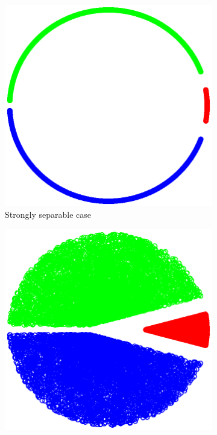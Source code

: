 \begin{figure}[h]
\centering
\begin{subfigure}[b]{0.23\textwidth}
\captionsetup{justification=centering}
\begin{center}
\hspace*{-0.3cm} \includegraphics[width=1.15\textwidth, trim={0, 0cm, 0, 0}, clip]{figures/strong_points}
\caption{Strongly separable case}
\label{figure:strongly-separable-dataset}
\end{center}
\end{subfigure}
\hfill
\begin{subfigure}[b]{0.23\textwidth}
\captionsetup{justification=centering}
\centering
\hspace*{-0.3cm}  \includegraphics[width=1.15\textwidth, trim={0, 0cm, 0, 0}, clip]{figures/weak_points}

\end{subfigure}
\end{figure}
